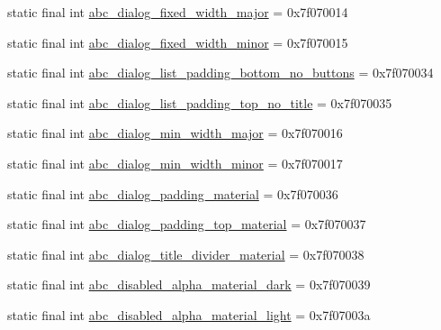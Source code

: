 \begin{CompactItemize}
\item 
static final int \hyperlink{classandroid_1_1support_1_1graphics_1_1drawable_1_1animated_1_1_r_1_1dimen_848ff9f5aaa17b304a51754bc2fdc3ba}{abc\_\-dialog\_\-fixed\_\-width\_\-major} = 0x7f070014
\item 
static final int \hyperlink{classandroid_1_1support_1_1graphics_1_1drawable_1_1animated_1_1_r_1_1dimen_123037c906af3530eb9dab2990af6cf0}{abc\_\-dialog\_\-fixed\_\-width\_\-minor} = 0x7f070015
\item 
static final int \hyperlink{classandroid_1_1support_1_1graphics_1_1drawable_1_1animated_1_1_r_1_1dimen_d9b14bc5b5139358c8514e12ad68d08a}{abc\_\-dialog\_\-list\_\-padding\_\-bottom\_\-no\_\-buttons} = 0x7f070034
\item 
static final int \hyperlink{classandroid_1_1support_1_1graphics_1_1drawable_1_1animated_1_1_r_1_1dimen_c8c295a9a2fb233d41096f822f61ad67}{abc\_\-dialog\_\-list\_\-padding\_\-top\_\-no\_\-title} = 0x7f070035
\item 
static final int \hyperlink{classandroid_1_1support_1_1graphics_1_1drawable_1_1animated_1_1_r_1_1dimen_a2a5fbcb2a069f8c0c72a5c79f0aa39e}{abc\_\-dialog\_\-min\_\-width\_\-major} = 0x7f070016
\item 
static final int \hyperlink{classandroid_1_1support_1_1graphics_1_1drawable_1_1animated_1_1_r_1_1dimen_48107d55a43af89c462c6fb1c1aba706}{abc\_\-dialog\_\-min\_\-width\_\-minor} = 0x7f070017
\item 
static final int \hyperlink{classandroid_1_1support_1_1graphics_1_1drawable_1_1animated_1_1_r_1_1dimen_f7c0344b4c907841ddea23b60dc4d076}{abc\_\-dialog\_\-padding\_\-material} = 0x7f070036
\item 
static final int \hyperlink{classandroid_1_1support_1_1graphics_1_1drawable_1_1animated_1_1_r_1_1dimen_3b043e1dfe9c4b7b69f2248c16b3d0b7}{abc\_\-dialog\_\-padding\_\-top\_\-material} = 0x7f070037
\item 
static final int \hyperlink{classandroid_1_1support_1_1graphics_1_1drawable_1_1animated_1_1_r_1_1dimen_1becdc7e8e0f520688bc003ae8a58f9f}{abc\_\-dialog\_\-title\_\-divider\_\-material} = 0x7f070038
\item 
static final int \hyperlink{classandroid_1_1support_1_1graphics_1_1drawable_1_1animated_1_1_r_1_1dimen_867952fb1029105afd7f7c5b2aef3388}{abc\_\-disabled\_\-alpha\_\-material\_\-dark} = 0x7f070039
\item 
static final int \hyperlink{classandroid_1_1support_1_1graphics_1_1drawable_1_1animated_1_1_r_1_1dimen_d9e4caa9f4110bba9b874ac0c12232a3}{abc\_\-disabled\_\-alpha\_\-material\_\-light} = 0x7f07003a

\end{CompactItemize}
